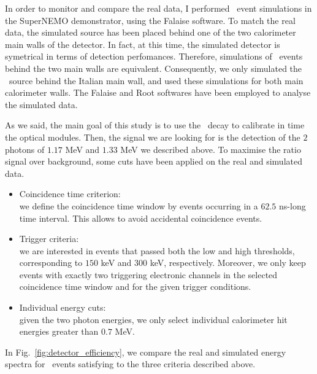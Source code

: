In order to monitor and compare the real data, I performed \Co\ event simulations in the SuperNEMO demonstrator, using the Falaise software.
To match the real data, the simulated source has been placed behind one of the two calorimeter main walls of the detector.
In fact, at this time, the simulated detector is symetrical in terms of detection perfomances.
Therefore, simulations of \Co\ events behind the two main walls are equivalent.
Consequently, we only simulated the \Co\ source behind the Italian main wall, and used these simulations for both main calorimeter walls.
The Falaise and Root softwares have been employed to analyse the simulated data.

As we said, the main goal of this study is to use the \Co\ decay to calibrate in time the optical modules.
Then, the signal we are looking for is the detection of the $2$ photons of $1.17$ MeV and $1.33$ MeV we described above.
To maximise the ratio signal over background, some cuts have been applied on the real and simulated data.
\begin{itemize}
\item Coincidence time criterion:\\ we define the coincidence time window by events occurring in a $62.5$ ns-long time interval.
  This allows to avoid accidental coincidence events.
\item Trigger criteria:\\ we are interested in events that passed both the low and high thresholds, corresponding to $150$ keV and $300$ keV, respectively.
  Moreover, we only keep events with exactly two triggering electronic channels in the selected coincidence time window and for the given trigger conditions.
\item Individual energy cuts:\\ given the two photon energies, we only select individual calorimeter hit energies greater than $0.7$ MeV.
\end{itemize}
In Fig.~\ref{fig:detector_efficiency}, we compare the real and simulated energy spectra for \Co\ events satisfying to the three criteria described above.
